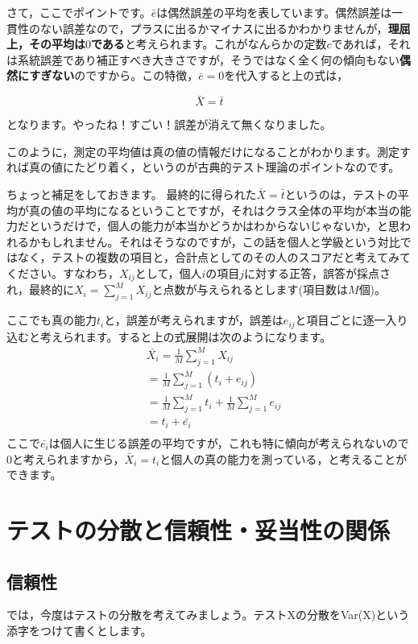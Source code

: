 \documentclass{ltjbook}
\begin{document}
さて，ここでポイントです。$\bar{e}$は偶然誤差の平均を表しています。偶然誤差は一貫性のない誤差なので，プラスに出るかマイナスに出るかわかりませんが，\textbf{理屈上，その平均は$0$である}と考えられます。これがなんらかの定数$c$であれば，それは系統誤差であり補正すべき大きさですが，そうではなく全く何の傾向もない\textbf{偶然にすぎない}のですから。この特徴，$\bar{e}=0$を代入すると上の式は，

\[ \bar{X} = \bar{t} \]

となります。やったね！すごい！誤差が消えて無くなりました。

このように，測定の平均値は真の値の情報だけになることがわかります。測定すれば真の値にたどり着く，というのが古典的テスト理論のポイントなのです。

ちょっと補足をしておきます。
最終的に得られた$\bar{X} = \bar{t}$というのは，テストの平均が真の値の平均になるということですが，それはクラス全体の平均が本当の能力だというだけで，個人の能力が本当かどうかはわからないじゃないか，と思われるかもしれません。それはそうなのですが，この話を個人と学級という対比ではなく，テストの複数の項目と，合計点としてのその人のスコアだと考えてみてください。すなわち，$X_{ij}$として，個人$i$の項目$j$に対する正答，誤答が採点され，最終的に$X_i = \sum_{j=1}^M X_{ij}$と点数が与えられるとします(項目数は$M$個)。

ここでも真の能力$t_i$と，誤差が考えられますが，誤差は$e_{ij}$と項目ごとに逐一入り込むと考えられます。すると上の式展開は次のようになります。
\begin{align*}
&           \bar{X_i}  =  \frac{1}{M}\sum_{j=1}^M X_{ij} \\
&                         =  \frac{1}{M}\sum_{j=1}^M (t_i + e_{ij}) \\
&                         =  \frac{1}{M}\sum_{j=1}^M t_i + \frac{1}{M}\sum_{j=1}^M e_{ij} \\
&                         =  t_i + \bar{e_{i}} \\
\end{align*}
ここで$\bar{e_i}$は個人に生じる誤差の平均ですが，これも特に傾向が考えられないので$0$と考えられますから，$\bar{X}_i = t_i $と個人の真の能力を測っている，と考えることができます。

\section{テストの分散と信頼性・妥当性の関係}
\subsection{信頼性}
では，今度はテストの分散を考えてみましょう。テストXの分散をVar(X)という添字をつけて書くとします。
\end{document}
